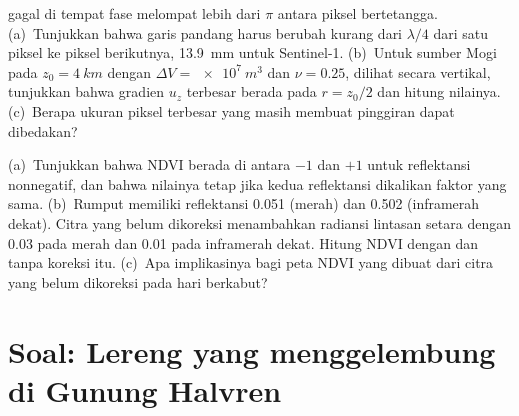 \begin{exercise}[$\star\star\star$]\label{exo:b3:remote-sensing-gis:11}
 gagal di tempat fase melompat lebih dari $\pi$ antara
piksel bertetangga. (a)~Tunjukkan bahwa garis pandang harus berubah kurang dari
$\lambda/4$ dari satu piksel ke piksel berikutnya, \qty{13.9}{mm} untuk
Sentinel-1. (b)~Untuk sumber Mogi pada $z_0 = \qty{4}{km}$ dengan $\Delta V =
\qty{e7}{m^3}$ dan $\nu = 0.25$, dilihat secara vertikal, tunjukkan bahwa
gradien $u_z$ terbesar berada pada $r = z_0/2$ dan hitung nilainya. (c)~Berapa
ukuran piksel terbesar yang masih membuat pinggiran dapat dibedakan?
\end{exercise}

\begin{exercise}[$\star\star\star$]\label{exo:b3:remote-sensing-gis:12}
(a)~Tunjukkan bahwa NDVI berada di antara $-1$ dan $+1$ untuk
reflektansi nonnegatif, dan bahwa nilainya tetap jika kedua reflektansi
dikalikan faktor yang sama. (b)~Rumput memiliki reflektansi 0.051 (merah)
dan 0.502 (inframerah dekat). Citra yang belum dikoreksi menambahkan radiansi lintasan
setara dengan 0.03 pada merah dan 0.01 pada inframerah dekat. Hitung
NDVI dengan dan tanpa koreksi itu. (c)~Apa implikasinya bagi peta NDVI
yang dibuat dari citra yang belum dikoreksi pada hari berkabut?
\end{exercise}

\section{Soal: Lereng yang menggelembung di Gunung Halvren}

